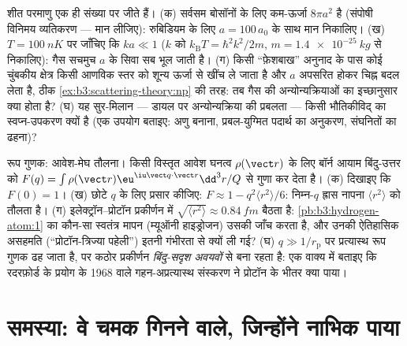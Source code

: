 \begin{exercise}[$\star\star\star$]\label{exo:b3:scattering-theory:11}
शीत परमाणु एक ही संख्या पर जीते हैं। (क) सर्वसम बोसॉनों के लिए
कम-ऊर्जा  $8\pi a^2$ है (संपोषी विनिमय
व्यतिकरण --- मान लीजिए): रुबिडियम के लिए $a =
100\,a_0$ के साथ मान निकालिए। (ख) $T = \qty{100}{nK}$ पर जाँचिए कि $ka \ll 1$
($k$ को $k_{\text{B}}T = \hbar^2k^2/2m$, $m =
\qty{1.4e-25}{kg}$ से निकालिए): गैस सचमुच $a$ के सिवा सब भूल जाती है।
(ग) किसी ``फ़ेशबाख'' अनुनाद के पास कोई चुंबकीय क्षेत्र किसी
आणविक स्तर को शून्य ऊर्जा से खींच ले जाता है और $a$ अपसरित होकर चिह्न
बदल लेता है, ठीक \cref{ex:b3:scattering-theory:np} की तरह: तब गैस की
अन्योन्यक्रियाओं का इच्छानुसार क्या होता है? (घ) यह
सुर-मिलान --- डायल पर अन्योन्यक्रिया की प्रबलता --- किसी भौतिकीविद् का
स्वप्न-उपकरण क्यों है (एक उपयोग बताइए: अणु बनाना, प्रबल-युग्मित
पदार्थ का अनुकरण, संघनितों का ढहना)?
\end{exercise}

\begin{exercise}[$\star\star\star$]\label{exo:b3:scattering-theory:12}
रूप गुणक: आवेश-मेघ तौलना। किसी विस्तृत आवेश
घनत्व $\rho(\vect r)$ के लिए बॉर्न आयाम बिंदु-उत्तर को
$F(q) = \int\rho(\vect r)\eu^{\iu\vect q\cdot\vect r}
\dd^3r/Q$ से गुणा कर देता है। (क) दिखाइए कि $F(0) = 1$। (ख) छोटे $q$ के लिए प्रसार कीजिए: $F
\approx 1 - q^2\langle r^2\rangle/6$: निम्न-$q$ ह्रास नापना
$\langle r^2\rangle$ को तौलता है। (ग) इलेक्ट्रॉन--प्रोटॉन
प्रकीर्णन में $\sqrt{\langle r^2\rangle} \approx \qty{0.84}{fm}$ बैठता है:
\cref{pb:b3:hydrogen-atom:1} का कौन-सा स्वतंत्र मापन
(म्यूऑनी हाइड्रोजन) उसकी जाँच करता है,
और उनकी ऐतिहासिक असहमति (``प्रोटॉन-त्रिज्या पहेली'')
इतनी गंभीरता से क्यों ली गई? (घ) $q \gg 1/r_{\text{p}}$ पर
प्रत्यास्थ रूप गुणक ढह जाता है, पर कठोर प्रकीर्णन
\emph{बिंदु-सदृश अवयवों} से बना रहता है: एक वाक्य में बताइए कि
रदरफ़ोर्ड के प्रयोग के 1968 वाले गहन-अप्रत्यास्थ संस्करण ने प्रोटॉन
के भीतर क्या पाया।
\end{exercise}

\section{समस्या: वे चमक गिनने वाले, जिन्होंने नाभिक पाया}

